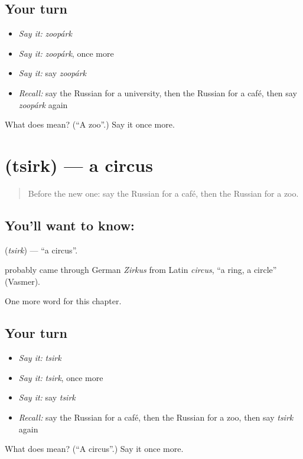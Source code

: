 \subsection*{Your turn}
\begin{itemize}
\raggedright
  \item \emph{Say it:} \emph{zoopárk}
  \item \emph{Say it:} \emph{zoopárk}, once more
  \item \emph{Say it:} say \emph{zoopárk}
  \item \emph{Recall:} say the Russian for a university, then the Russian for a café, then say \emph{zoopárk} again
\end{itemize}

\begin{tcolorbox}[breakable,colback=teal!4,colframe=teal!35!black,title={Before you move on}]
What does  mean? (\textquotedblleft{}A zoo\textquotedblright{}.) Say it once more.
\end{tcolorbox}
\section[\texorpdfstring{\ru{цирк} (tsirk)}{цирк (tsirk)}]{ (tsirk) — a circus}

\label{lesson:RU-C242-tsirk}



\begin{quote}
Before the new one: say the Russian for a café, then the Russian for a zoo.
\end{quote}

\subsection*{You'll want to know: }
\textbf{} (\emph{tsirk}) — \textquotedblleft{}a circus\textquotedblright{}.

\begin{cousinweb}
\textbf{} probably came through German \emph{Zirkus} from Latin \emph{circus}, \textquotedblleft{}a ring, a circle\textquotedblright{} (Vasmer).
\end{cousinweb}

\begin{grammarlens}[title={What you've built}]
One more word for this chapter.
\end{grammarlens}

\subsection*{Your turn}
\begin{itemize}
\raggedright
  \item \emph{Say it:} \emph{tsirk}
  \item \emph{Say it:} \emph{tsirk}, once more
  \item \emph{Say it:} say \emph{tsirk}
  \item \emph{Recall:} say the Russian for a café, then the Russian for a zoo, then say \emph{tsirk} again
\end{itemize}

\begin{tcolorbox}[breakable,colback=teal!4,colframe=teal!35!black,title={Before you move on}]
What does  mean? (\textquotedblleft{}A circus\textquotedblright{}.) Say it once more.
\end{tcolorbox}
